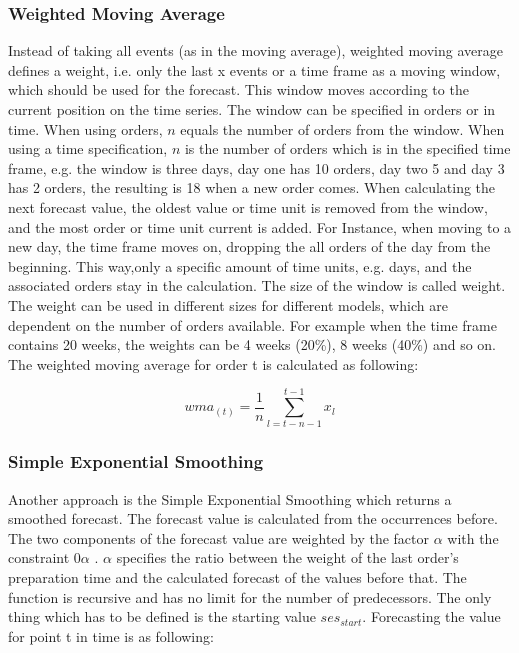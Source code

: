 \subsubsection{Weighted Moving Average}\label{subsubsection:Weighted Moving Average}
Instead of taking all events (as in the moving average), weighted moving average defines a weight, i.e. only the last x events or a time frame  as a moving window, which should be used for the forecast. This window moves according to the current position on the time series. The window can be specified in orders or in time. When using orders, $n$ equals the number of orders from the window. When using a time specification, $n$ is the number of orders which is in the specified time frame, e.g. the window is three days, day one has 10 orders, day two 5 and day 3 has 2 orders, the resulting is 18 when a new order comes. When calculating the next forecast value, the oldest value or time unit is removed from the window, and the most order or time unit current is added. For Instance, when moving to a new day, the time frame moves on, dropping the all orders of the day from the beginning. This way,only a specific amount of time units, e.g. days, and the associated orders stay in the calculation. The size of the window is called weight. The weight can be used in different sizes for different models, which are dependent on the number of orders available. For example when the time frame contains 20 weeks, the weights can be 4 weeks (20\%), 8 weeks (40\%) and so on.\newline
The weighted moving average for order t is calculated as following:

\begin{center}
\begin{equation}
wma_{(t)}= \frac{1}{n}\sum^{t-1}_{l = t-n-1} x_{l}
\end{equation}
\end{center}

\subsubsection{Simple Exponential Smoothing}\label{subsubsection:Simple Exponential Smoothing}
Another approach is the Simple Exponential Smoothing which returns a smoothed forecast. The forecast value is calculated from the occurrences before. The two components of the forecast value are weighted by the factor $\alpha$ with the constraint 0\le $\alpha$ . $\alpha$ specifies the ratio between the weight of the last order's preparation time and the calculated forecast of the values before that. The function is recursive and has no limit for the number of predecessors. The only thing which has to be defined is the starting value $ses_{start}$.\newline
Forecasting the value for point t in time is as following:

